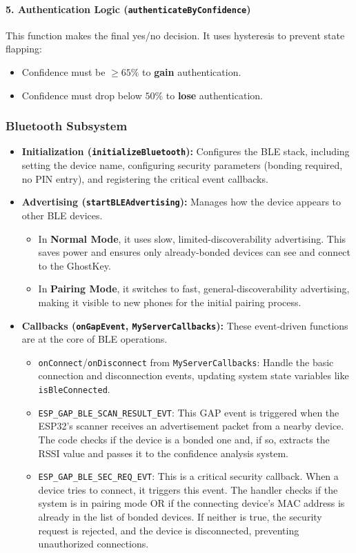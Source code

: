 \documentclass{article}
\begin{document}
\paragraph{5. Authentication Logic (\texttt{authenticateByConfidence})}
This function makes the final yes/no decision. It uses hysteresis to prevent state flapping:
\begin{itemize}
    \item Confidence must be $\ge 65\%$ to \textbf{gain} authentication.
    \item Confidence must drop below $50\%$ to \textbf{lose} authentication.
\end{itemize}

\subsubsection{Bluetooth Subsystem}
\begin{itemize}
    \item \textbf{Initialization (\texttt{initializeBluetooth}):} Configures the BLE stack, including setting the device name, configuring security parameters (bonding required, no PIN entry), and registering the critical event callbacks.
    \item \textbf{Advertising (\texttt{startBLEAdvertising}):} Manages how the device appears to other BLE devices.
    \begin{itemize}
        \item In \textbf{Normal Mode}, it uses slow, limited-discoverability advertising. This saves power and ensures only already-bonded devices can see and connect to the GhostKey.
        \item In \textbf{Pairing Mode}, it switches to fast, general-discoverability advertising, making it visible to new phones for the initial pairing process.
    \end{itemize}
    \item \textbf{Callbacks (\texttt{onGapEvent}, \texttt{MyServerCallbacks}):} These event-driven functions are at the core of BLE operations.
    \begin{itemize}
        \item \texttt{onConnect}/\texttt{onDisconnect} from \texttt{MyServerCallbacks}: Handle the basic connection and disconnection events, updating system state variables like \texttt{isBleConnected}.
        \item \texttt{ESP\_GAP\_BLE\_SCAN\_RESULT\_EVT}: This GAP event is triggered when the ESP32's scanner receives an advertisement packet from a nearby device. The code checks if the device is a bonded one and, if so, extracts the RSSI value and passes it to the confidence analysis system.
        \item \texttt{ESP\_GAP\_BLE\_SEC\_REQ\_EVT}: This is a critical security callback. When a device tries to connect, it triggers this event. The handler checks if the system is in pairing mode OR if the connecting device's MAC address is already in the list of bonded devices. If neither is true, the security request is rejected, and the device is disconnected, preventing unauthorized connections.
    \end{itemize}
\end{itemize}
\end{document}
